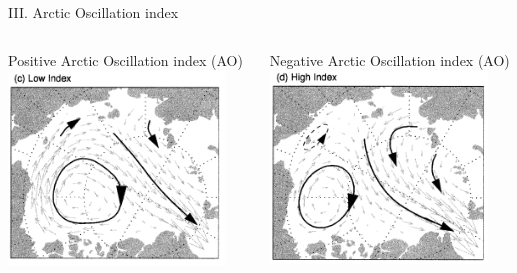 \documentclass[8pt]{beamer}
\begin{document}
\setwatermark{\fontsize{125pt}{125pt}\selectfont{}}
\begin{frame}[fragile]{III. Arctic Oscillation index}
	\begin{columns}
		Positive Arctic Oscillation index (AO)
		\includegraphics[width=0.9\textwidth]{./img/LowAO_Rigor.png}

		Negative Arctic Oscillation index (AO)	\includegraphics[width=0.9\textwidth]{./img/HighAO_Rigor.png}
\end{columns}
\end{frame}
\end{document}
